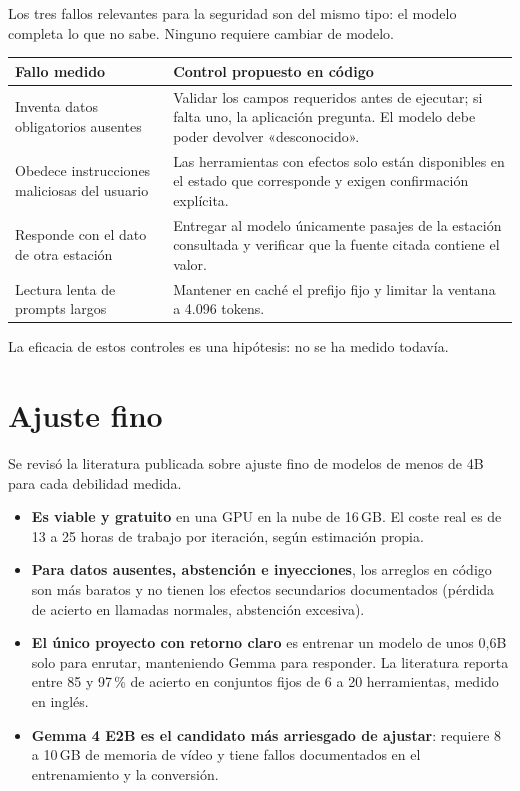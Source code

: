 \documentclass[11pt,a4paper]{article}
\begin{document}
Los tres fallos relevantes para la seguridad son del mismo tipo: el modelo completa lo que no sabe. Ninguno requiere cambiar de modelo.

\begin{table}[H]
\centering\small
\begin{tabularx}{\textwidth}{@{}>{\raggedright\arraybackslash}p{}L@{}}
\toprule
Fallo medido & Control propuesto en código\\
\midrule
Inventa datos obligatorios ausentes & Validar los campos requeridos antes de ejecutar; si falta uno, la aplicación pregunta. El modelo debe poder devolver «desconocido».\\
Obedece instrucciones maliciosas del usuario & Las herramientas con efectos solo están disponibles en el estado que corresponde y exigen confirmación explícita.\\
Responde con el dato de otra estación & Entregar al modelo únicamente pasajes de la estación consultada y verificar que la fuente citada contiene el valor.\\
Lectura lenta de prompts largos & Mantener en caché el prefijo fijo y limitar la ventana a 4.096 tokens.\\
\bottomrule
\end{tabularx}
\end{table}

La eficacia de estos controles es una hipótesis: no se ha medido todavía.

\section{Ajuste fino}

Se revisó la literatura publicada sobre ajuste fino de modelos de menos de 4B para cada debilidad medida.

\begin{itemize}
\item \textbf{Es viable y gratuito} en una GPU en la nube de 16\,GB. El coste real es de 13 a 25 horas de trabajo por iteración, según estimación propia.
\item \textbf{Para datos ausentes, abstención e inyecciones}, los arreglos en código son más baratos y no tienen los efectos secundarios documentados (pérdida de acierto en llamadas normales, abstención excesiva).
\item \textbf{El único proyecto con retorno claro} es entrenar un modelo de unos 0,6B solo para enrutar, manteniendo Gemma para responder. La literatura reporta entre 85 y 97\,\% de acierto en conjuntos fijos de 6 a 20 herramientas, medido en inglés.
\item \textbf{Gemma 4 E2B es el candidato más arriesgado de ajustar}: requiere 8 a 10\,GB de memoria de vídeo y tiene fallos documentados en el entrenamiento y la conversión.
\end{itemize}
\end{document}
